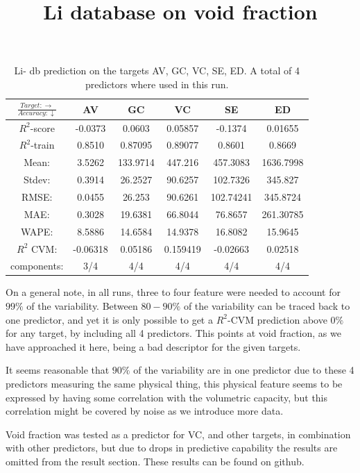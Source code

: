 \begin{table}[H]
\scriptsize
\centering
\caption{Li- db prediction on the targets AV, GC, VC, SE, ED. A total of 4 predictors where used in this run.}
\title{Li database on void fraction}
\begin{tabular}{|c|c|c|c|c|c|}
	\hline 
	$\frac{Target: \rightarrow}{Accuracy:\downarrow} $ & AV & GC & VC & SE & ED 
	 \\ 
	\hline
	$R^2$-score 	& -0.0373 & 0.0603 & 0.05857 &  -0.1374 &  0.01655\\ 
	\hline 
	$R^2$-train 	&  0.8510 &  0.87095 & 0.89077 &  0.8601 & 0.8669 \\ 
	\hline
	Mean: 		 &3.5262&133.9714&447.216	&457.3083&1636.7998	\\
	\hline 
	Stdev:		 &0.3914	&26.2527	&90.6257&102.7326&345.827\\
	\hline 
	RMSE: 		&0.0455& 26.253 &  90.6261 & 102.74241 & 345.8724 \\ 
	\hline
	MAE: 		& 0.3028 & 19.6381& 66.8044 & 76.8657 & 261.30785 \\ 
	\hline
	WAPE: 		& 8.5886 & 14.6584 & 14.9378  & 16.8082 & 15.9645 \\
	\hline
	$R^2$ CVM: & -0.06318 & 0.05186 & 0.159419  & -0.02663 & 0.02518 \\
	\hline
	components: & 3/4 	& 4/4 & 4/4  & 4/4 & 4/4 \\
	\hline
\end{tabular}
\label{tab:Li-poreBlazer}
\end{table}


On a general note, in all runs, three to four feature were needed to account for $99\%$ of the variability. Between $80-90\%$ of the variability can be traced back to one predictor, and yet it is only possible to get a $R^2$-CVM prediction above $0\%$ for any target, by including all 4 predictors. This points at void fraction, as we have approached it here, being a bad descriptor for the given targets. 

It seems reasonable that $90\%$ of the variability are in one predictor due to these 4 predictors measuring the same physical thing, this physical feature seems to be expressed by having some correlation with the volumetric capacity, but this correlation might be covered by noise as we introduce more data.

Void fraction was tested as a predictor for VC, and other targets, in combination with other predictors, but due to drops in predictive capability the results are omitted from the result section. These results can be found on github.

